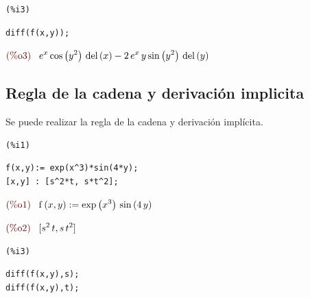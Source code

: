 \documentclass[12pt]{article}
\begin{document}
\noindent

\begin{minipage}[t]{8ex}{\color{red}\bf
\begin{verbatim}
(%i3) 
\end{verbatim}}
\end{minipage}
\begin{minipage}[t]{\textwidth}{\color{blue}
\begin{verbatim}
diff(f(x,y));
\end{verbatim}}
\end{minipage}

\begin{math}\displaystyle
\parbox{8ex}{\color{labelcolor}(\%o3) }
{e}^{x}\,\mathrm{cos}\left( {y}^{2}\right) \,\mathrm{del}\left( x\right) -2\,{e}^{x}\,y\,\mathrm{sin}\left( {y}^{2}\right) \,\mathrm{del}\left( y\right) 
\end{math}


\subsection{Regla de la cadena y derivación implicita}
Se puede realizar la regla de la cadena y derivación implícita.
\noindent

\begin{minipage}[t]{8ex}{\color{red}\bf
\begin{verbatim}
(%i1) 
\end{verbatim}}
\end{minipage}
\begin{minipage}[t]{\textwidth}{\color{blue}
\begin{verbatim}
f(x,y):= exp(x^3)*sin(4*y);
[x,y] : [s^2*t, s*t^2];
\end{verbatim}}
\end{minipage}

\begin{math}\displaystyle
\parbox{8ex}{\color{labelcolor}(\%o1) }
\mathrm{f}\left( x,y\right) :=\mathrm{exp}\left( {x}^{3}\right) \,\mathrm{sin}\left( 4\,y\right) 
\end{math}

\begin{math}\displaystyle
\parbox{8ex}{\color{labelcolor}(\%o2) }
[{s}^{2}\,t,s\,{t}^{2}]
\end{math}

\noindent

\begin{minipage}[t]{8ex}{\color{red}\bf
\begin{verbatim}
(%i3) 
\end{verbatim}}
\end{minipage}
\begin{minipage}[t]{\textwidth}{\color{blue}
\begin{verbatim}
diff(f(x,y),s);
diff(f(x,y),t);
\end{verbatim}}
\end{minipage}
\end{document}
